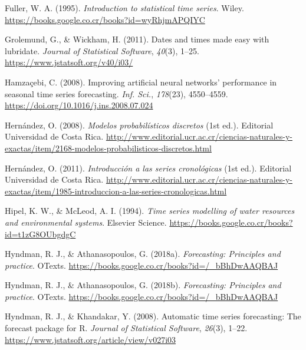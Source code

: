 \documentclass[
]{article}
\newlength{\cslhangindent}
\newlength{\cslentryspacingunit} %
\newenvironment{CSLReferences}[2] %
 {%
  \setlength{\parindent}{0pt}
  \ifodd #1
  \let\oldpar\par
  \def\par{\hangindent=\cslhangindent\oldpar}
  \fi
  \setlength{\parskip}{#2\cslentryspacingunit}
 }%
 {}
\begin{document}
\begin{CSLReferences}{1}{0}
\leavevmode{}%
Fuller, W. A. (1995). \emph{Introduction to statistical time series}.
Wiley. \url{https://books.google.co.cr/books?id=wyRhjmAPQIYC}

\leavevmode{}%
Grolemund, G., \& Wickham, H. (2011). Dates and times made easy with
{lubridate}. \emph{Journal of Statistical Software}, \emph{40}(3),
1--25. \url{https://www.jstatsoft.org/v40/i03/}

\leavevmode{}%
Hamzaçebi, C. (2008). Improving artificial neural networks' performance
in seasonal time series forecasting. \emph{Inf. Sci.}, \emph{178}(23),
4550--4559. \url{https://doi.org/10.1016/j.ins.2008.07.024}

\leavevmode{}%
Hernández, O. (2008). \emph{Modelos probabilísticos discretos} (1st
ed.). Editorial Universidad de Costa Rica.
\url{http://www.editorial.ucr.ac.cr/ciencias-naturales-y-exactas/item/2168-modelos-probabilisticos-discretos.html}

\leavevmode{}%
Hernández, O. (2011). \emph{Introducción a las series cronológicas} (1st
ed.). Editorial Universidad de Costa Rica.
\url{http://www.editorial.ucr.ac.cr/ciencias-naturales-y-exactas/item/1985-introduccion-a-las-series-cronologicas.html}

\leavevmode{}%
Hipel, K. W., \& McLeod, A. I. (1994). \emph{Time series modelling of
water resources and environmental systems}. Elsevier Science.
\url{https://books.google.co.cr/books?id=t1zG8OUbgdgC}

\leavevmode{}%
Hyndman, R. J., \& Athanasopoulos, G. (2018a). \emph{Forecasting:
Principles and practice}. OTexts.
\url{https://books.google.co.cr/books?id=/_bBhDwAAQBAJ}

\leavevmode{}%
Hyndman, R. J., \& Athanasopoulos, G. (2018b). \emph{Forecasting:
Principles and practice}. OTexts.
\url{https://books.google.co.cr/books?id=/_bBhDwAAQBAJ}

\leavevmode{}%
Hyndman, R. J., \& Khandakar, Y. (2008). Automatic time series
forecasting: The forecast package for {R}. \emph{Journal of Statistical
Software}, \emph{26}(3), 1--22.
\url{https://www.jstatsoft.org/article/view/v027i03}


\end{CSLReferences}
\end{document}
